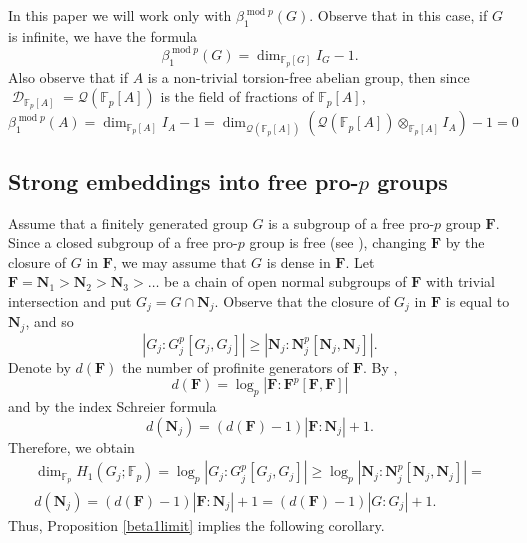 \documentclass[11pt]{amsart}
\numberwithin{claimcounter}{lem}
\DeclareMathOperator{\D}{\mathcal D}
\newcommand{\F}{\mathbb{F}}
\begin{document}
In this paper we will work only with $ \beta_1^{\operatorname{mod}p}(G)$. Observe that in this case, if $G$ is infinite,  we have   the formula
$$ \beta_1^{\operatorname{mod}p}(G)=\dim_{\F_p[G]} I_G  -1.$$
Also observe that if $A$ is a  non-trivial  torsion-free abelian group, then  since $\D_{\F_p[A]}=\mathcal Q(\F_p[A])$ is the field of fractions of $\F_p[A]$,
\begin{equation}\label{abelian} \beta_1^{\operatorname{mod}p}(A)=\dim_{\F_p[A]} I_A  -1=\dim_{\mathcal Q(\F_p[A])}(\mathcal Q(\F_p[A])\otimes_{\F_p[A]} I_A)-1=0\end{equation}
\subsection{Strong embeddings into   free  pro-$p$ groups}
Assume that a finitely generated group $G$ is a subgroup of a free pro-$p$ group $\mathbf F$. Since a closed subgroup of a free pro-$p$ group is free  (see \cite[Corollary 7.7.5]{RZ10}), changing $\mathbf F$ by the closure of $G$ in $\mathbf F$, we may assume that $G$ is dense in $\mathbf F$. 
Let $\mathbf F=\mathbf N_1>\mathbf N_2>\mathbf N_3> \ldots$ be a chain of open normal subgroups of $\mathbf F$ with trivial intersection and put $G_j=G\cap \mathbf  N_j$. 
Observe that  the closure of $G_j$ in $\mathbf F$ is equal to $\mathbf N_j$, and so
\begin{equation}\label{discpro}
|G_j:G_j^p[G_j,G_j]|\ge |\mathbf N_j:\mathbf N_j^p[\mathbf N_j,\mathbf N_j]|.
\end{equation}
Denote by $d(\mathbf F)$ the number of profinite generators of $\mathbf F$. By \cite[Theorem 7.8.1]{RZ10}, $$d(\mathbf F)= \log_p |\mathbf F:\mathbf F^p[\mathbf F,\mathbf F]|$$ and by the index Schreier formula $$d(\mathbf N_j)=(d(\mathbf F)-1)|\mathbf F:\mathbf N_j|+1.$$ Therefore, we obtain
\begin{multline*}
\dim_{\F_p} H_1(G_j;\F_p)=\log_p |G_j:G_j^p[G_j,G_j]|\ge \log_p |\mathbf N_j:\mathbf N_j^p[\mathbf N_j,\mathbf N_j]|=\\ d(\mathbf N_j)=(d(\mathbf F)-1)|\mathbf F:\mathbf N_j|+1=(d(\mathbf F)-1)|G:G_j|+1.\end{multline*}
Thus,  Proposition \ref{beta1limit} implies the following corollary.
\end{document}
